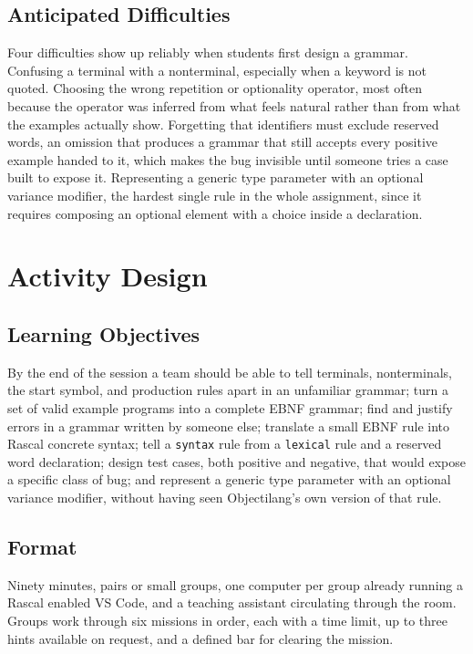 \documentclass[11pt]{article}
\begin{document}
\subsection{Anticipated Difficulties}

Four difficulties show up reliably when students first design a grammar.
Confusing a terminal with a nonterminal, especially when a keyword is not
quoted. Choosing the wrong repetition or optionality operator, most often
because the operator was inferred from what feels natural rather than from
what the examples actually show. Forgetting that identifiers must exclude
reserved words, an omission that produces a grammar that still accepts
every positive example handed to it, which makes the bug invisible until
someone tries a case built to expose it. Representing a generic type
parameter with an optional variance modifier, the hardest single rule in
the whole assignment, since it requires composing an optional element with
a choice inside a declaration.

\section{Activity Design}

\subsection{Learning Objectives}

By the end of the session a team should be able to tell terminals,
nonterminals, the start symbol, and production rules apart in an unfamiliar
grammar; turn a set of valid example programs into a complete EBNF grammar;
find and justify errors in a grammar written by someone else; translate a
small EBNF rule into Rascal concrete syntax; tell a \texttt{syntax} rule
from a \texttt{lexical} rule and a reserved word declaration; design test
cases, both positive and negative, that would expose a specific class of
bug; and represent a generic type parameter with an optional variance
modifier, without having seen Objectilang's own version of that rule.

\subsection{Format}

Ninety minutes, pairs or small groups, one computer per group already
running a Rascal enabled VS Code, and a teaching assistant circulating
through the room. Groups work through six missions in order, each with a
time limit, up to three hints available on request, and a defined bar for
clearing the mission.
\end{document}

